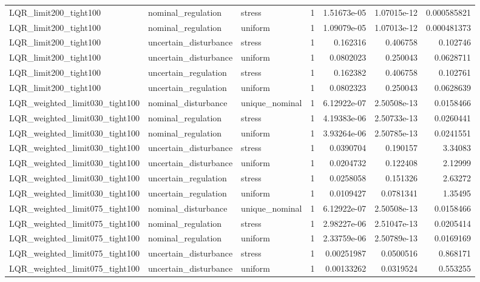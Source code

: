 \begin{tabular}{llllrrr}
LQR\_limit200\_tight100 & nominal\_regulation & stress & 1 & 1.51673e-05 & 1.07015e-12 & 0.000585821 \\
LQR\_limit200\_tight100 & nominal\_regulation & uniform & 1 & 1.09079e-05 & 1.07013e-12 & 0.000481373 \\
LQR\_limit200\_tight100 & uncertain\_disturbance & stress & 1 & 0.162316 & 0.406758 & 0.102746 \\
LQR\_limit200\_tight100 & uncertain\_disturbance & uniform & 1 & 0.0802023 & 0.250043 & 0.0628711 \\
LQR\_limit200\_tight100 & uncertain\_regulation & stress & 1 & 0.162382 & 0.406758 & 0.102761 \\
LQR\_limit200\_tight100 & uncertain\_regulation & uniform & 1 & 0.0802323 & 0.250043 & 0.0628639 \\
LQR\_weighted\_limit030\_tight100 & nominal\_disturbance & unique\_nominal & 1 & 6.12922e-07 & 2.50508e-13 & 0.0158466 \\
LQR\_weighted\_limit030\_tight100 & nominal\_regulation & stress & 1 & 4.19383e-06 & 2.50733e-13 & 0.0260441 \\
LQR\_weighted\_limit030\_tight100 & nominal\_regulation & uniform & 1 & 3.93264e-06 & 2.50785e-13 & 0.0241551 \\
LQR\_weighted\_limit030\_tight100 & uncertain\_disturbance & stress & 1 & 0.0390704 & 0.190157 & 3.34083 \\
LQR\_weighted\_limit030\_tight100 & uncertain\_disturbance & uniform & 1 & 0.0204732 & 0.122408 & 2.12999 \\
LQR\_weighted\_limit030\_tight100 & uncertain\_regulation & stress & 1 & 0.0258058 & 0.151326 & 2.63272 \\
LQR\_weighted\_limit030\_tight100 & uncertain\_regulation & uniform & 1 & 0.0109427 & 0.0781341 & 1.35495 \\
LQR\_weighted\_limit075\_tight100 & nominal\_disturbance & unique\_nominal & 1 & 6.12922e-07 & 2.50508e-13 & 0.0158466 \\
LQR\_weighted\_limit075\_tight100 & nominal\_regulation & stress & 1 & 2.98227e-06 & 2.51047e-13 & 0.0205414 \\
LQR\_weighted\_limit075\_tight100 & nominal\_regulation & uniform & 1 & 2.33759e-06 & 2.50789e-13 & 0.0169169 \\
LQR\_weighted\_limit075\_tight100 & uncertain\_disturbance & stress & 1 & 0.00251987 & 0.0500516 & 0.868171 \\
LQR\_weighted\_limit075\_tight100 & uncertain\_disturbance & uniform & 1 & 0.00133262 & 0.0319524 & 0.553255 \\

\end{tabular}
